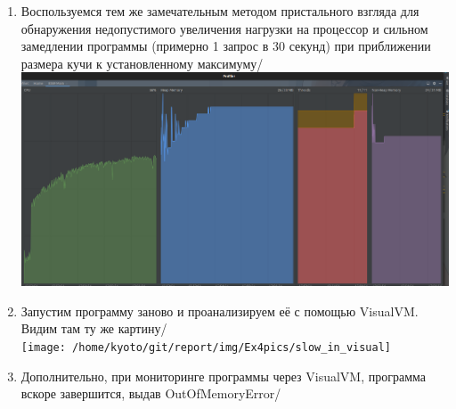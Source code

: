 \begin{enumerate}
    \item Воспользуемся тем же замечательным методом пристального взгляда для обнаружения недопустимого увеличения нагрузки на процессор и сильном
    замедлении программы (примерно 1 запрос в 30 секунд) при приближении размера кучи к установленному максимуму/\\
    \includegraphics[scale=0.2]{img/Ex4pics/slow_in_IDE}
    \item Запустим программу заново и проанализируем её с помощью VisualVM. Видим там ту же картину/\\
    \texttt{[image: /home/kyoto/git/report/img/Ex4pics/slow\_in\_visual]}
    \item Дополнительно, при мониторинге программы через VisualVM, программа вскоре завершится, выдав OutOfMemoryError/

    \newpage

    \thispagestyle{empty}

    \BgThispage


\end{enumerate}
